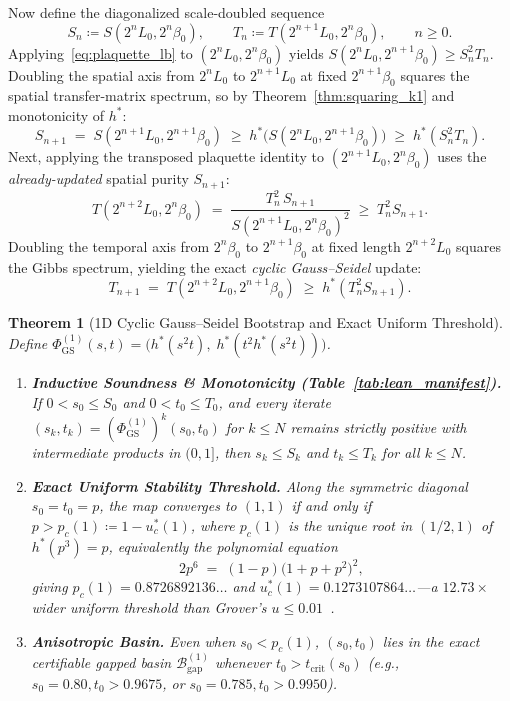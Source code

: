 \documentclass[11pt,a4paper]{article}
\newtheorem{theorem}{Theorem}[section]
\theoremstyle{definition}
\newcommand{\Bgap}{\mathcal{B}_{\mathrm{gap}}}
\begin{document}
Now define the diagonalized scale-doubled sequence
\[
  S_n \coloneqq S(2^n L_0, 2^n \beta_0), \qquad T_n \coloneqq T(2^{n+1} L_0, 2^n \beta_0), \qquad n \ge 0.
\]
Applying~\eqref{eq:plaquette_lb} to $(2^n L_0, 2^n \beta_0)$ yields $S(2^n L_0, 2^{n+1}\beta_0) \ge S_n^2 T_n$. Doubling the spatial axis from $2^n L_0$ to $2^{n+1} L_0$ at fixed $2^{n+1}\beta_0$ squares the spatial transfer-matrix spectrum, so by Theorem~\ref{thm:squaring_k1} and monotonicity of $h^*$:
\begin{equation}
  S_{n+1} \;=\; S(2^{n+1} L_0, 2^{n+1}\beta_0) \;\ge\; h^*\!\bigl(S(2^n L_0, 2^{n+1}\beta_0)\bigr) \;\ge\; h^*(S_n^2 T_n).
  \label{eq:gs_1d_S}
\end{equation}
Next, applying the transposed plaquette identity to $(2^{n+1}L_0, 2^n \beta_0)$ uses the \emph{already-updated} spatial purity $S_{n+1}$:
\[
  T(2^{n+2}L_0, 2^n \beta_0) \;=\; \frac{T_n^2\, S_{n+1}}{S(2^{n+1}L_0, 2^n \beta_0)^2} \;\ge\; T_n^2 S_{n+1}.
\]
Doubling the temporal axis from $2^n \beta_0$ to $2^{n+1}\beta_0$ at fixed length $2^{n+2}L_0$ squares the Gibbs spectrum, yielding the exact \emph{cyclic Gauss--Seidel} update:
\begin{equation}
  T_{n+1} \;=\; T(2^{n+2}L_0, 2^{n+1}\beta_0) \;\ge\; h^*(T_n^2 S_{n+1}).
  \label{eq:gs_1d_T}
\end{equation}

\begin{theorem}[1D Cyclic Gauss--Seidel Bootstrap and Exact Uniform Threshold]
\label{thm:gs_1d}
Define $\Phi_{\mathrm{GS}}^{(1)}(s,t) = \bigl(h^*(s^2 t),\; h^*(t^2 h^*(s^2 t))\bigr)$.
\begin{enumerate}[label=(\alph*),leftmargin=2em,itemsep=2pt]
  \item \textbf{Inductive Soundness \& Monotonicity (Table~\ref{tab:lean_manifest}).} If $0 < s_0 \le S_0$ and $0 < t_0 \le T_0$, and every iterate $(s_k, t_k) = (\Phi_{\mathrm{GS}}^{(1)})^k(s_0, t_0)$ for $k \le N$ remains strictly positive with intermediate products in $(0,1]$, then $s_k \le S_k$ and $t_k \le T_k$ for all $k \le N$.
  \item \textbf{Exact Uniform Stability Threshold.} Along the symmetric diagonal $s_0 = t_0 = p$, the map converges to $(1,1)$ if and only if $p > p_c(1) \coloneqq 1 - u_c^*(1)$, where $p_c(1)$ is the unique root in $(1/2, 1)$ of $h^*(p^3) = p$, equivalently the polynomial equation
  \begin{equation}
    2 p^6 \;=\; (1 - p)\bigl(1 + p + p^2\bigr)^2,
    \label{eq:poly_1d}
  \end{equation}
  giving $p_c(1) = 0.8726892136\dots$ and $u_c^*(1) = 0.1273107864\dots$—a $\mathbf{12.73\times}$ wider uniform threshold than Grover's $u \le 0.01$~\cite{Grover2026Extensions}.
  \item \textbf{Anisotropic Basin.} Even when $s_0 < p_c(1)$, $(s_0, t_0)$ lies in the exact certifiable gapped basin $\Bgap^{(1)}$ whenever $t_0 > t_{\mathrm{crit}}(s_0)$ (e.g., $s_0 = 0.80, t_0 > 0.9675$, or $s_0 = 0.785, t_0 > 0.9950$).
\end{enumerate}
\end{theorem}
\end{document}
